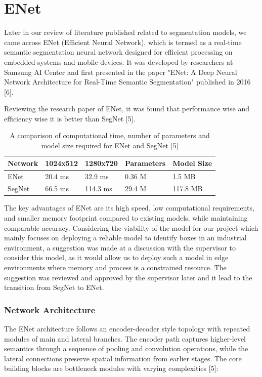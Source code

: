 \chapter{ENet}
Later in our review of literature published related to segmentation models, we came across ENet (Efficient Neural Network), which is termed as a real-time semantic segmentation neural network designed for efficient processing on embedded systems and mobile devices. It was developed by researchers at Samsung AI Center and first presented in the paper "ENet: A Deep Neural Network Architecture for Real-Time Semantic Segmentation" published in 2016 [6].

Reviewing the research paper of ENet, it was found that performance wise and efficiency wise it is better than SegNet [5].

\begin{table}[h!]
    \centering
    \setlength{\arrayrulewidth}{0.5mm}
    \setlength{\tabcolsep}{18pt}
    \renewcommand{\arraystretch}{1.5}
    \begin{tabular}{ |p{1.5cm}|p{1.8cm}|p{1.8cm}|p{2cm}|p{2cm}| }
        \hline
        Network & 1024x512 & 1280x720 & Parameters & Model Size \\
        \hline
        ENet    & 20.4 ms  & 32.9 ms  & 0.36 M     & 1.5 MB     \\
        \hline
        SegNet  & 66.5 ms  & 114.3 ms & 29.4 M     & 117.8 MB   \\
        \hline
    \end{tabular}
    \caption{A comparison of computational time, number of parameters and model size required for ENet and SegNet [5]}
    \label{table:1}
\end{table}

The key advantages of ENet are its high speed, low computational requirements, and smaller memory footprint compared to existing models, while maintaining comparable accuracy. Considering the viability of the model for our project which mainly focuses on deploying a reliable model to identify boxes in an industrial environment, a suggestion was made at a discussion with the supervisor to consider this model, as it would allow us to deploy such a model in edge environments where memory and process is a constrained resource. The suggestion was reviewed and approved by the supervisor later and it lead to the transition from SegNet to ENet.

\subsection{Network Architecture}
The ENet architecture follows an encoder-decoder style topology with repeated modules of main and lateral branches. The encoder path captures higher-level semantics through a sequence of pooling and convolution operations, while the lateral connections preserve spatial information from earlier stages. The core building blocks are bottleneck modules with varying complexities [5]:

